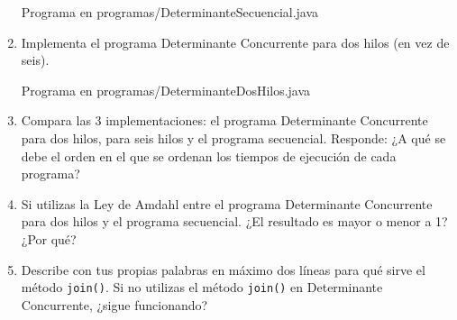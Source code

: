\documentclass[12pt]{article}
\begin{document}
\begin{enumerate}
      Programa en programas/DeterminanteSecuencial.java
      
    \item Implementa el programa Determinante Concurrente para dos hilos (en vez de seis).

      Programa en programas/DeterminanteDosHilos.java
      
    \item Compara las 3 implementaciones: el programa Determinante Concurrente para dos hilos, para seis hilos y el programa secuencial. Responde: ¿A qué se debe el orden en el que se ordenan los tiempos de ejecución de cada programa?
    \item Si utilizas la Ley de Amdahl entre el programa Determinante Concurrente para dos hilos y el programa secuencial. ¿El resultado es mayor o menor a 1? ¿Por qué?
    \item Describe con tus propias palabras en máximo dos líneas para qué sirve el método \texttt{join()}. Si no utilizas el método \texttt{join()} en Determinante Concurrente, ¿sigue funcionando?
\end{enumerate}
\end{document}
